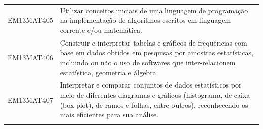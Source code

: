 \documentclass[12pt]{extarticle}
\begin{document}
\begin{longtable}{ll}
EM13MAT405 & Utilizar conceitos iniciais de uma linguagem de programação na implementação de algoritmos escritos em linguagem corrente e/ou matemática.                                                                                                                                                                                                                                                                                                                                                                                                                                                                                                                                                                                                                                                                            \\
\rowcolor[HTML]{FFF} 
EM13MAT406 & Construir e interpretar tabelas e gráficos de frequências com base em dados obtidos em pesquisas por amostras estatísticas, incluindo ou não o uso de softwares que inter-relacionem estatística, geometria e álgebra.                                                                                                                                                                                                                                                                                                                                                                                                                                                                                                                                                                                                \\
\rowcolor[HTML]{E0F7FA} 
EM13MAT407 & Interpretar e comparar conjuntos de dados estatísticos por meio de diferentes diagramas e gráficos (histograma, de caixa (box-plot), de ramos e folhas, entre outros), reconhecendo os mais eficientes para sua análise.                                                                                                                                                                                                                                                                                                                                                                                                                                                                                                                                                                                              \\
\rowcolor[HTML]{FFF} 

\end{longtable}
\end{document}
